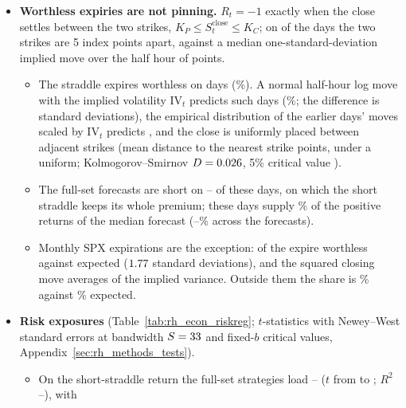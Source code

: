 \begin{itemize}
\item \textbf{Worthless expiries are not pinning.} $R_t = -1$ exactly when the close settles between the two strikes,
  $K_P \le S^{\mathrm{close}}_t \le K_C$; on \rhedGapFiveN{} of the \rheSzDays{} days the two strikes are 5 index
  points apart, against a median one-standard-deviation implied move over the half hour of \rhedMoveSdPts{} points.
  \begin{itemize}
  \item The straddle expires worthless on \rhedWorthN{} days (\rhedWorthPct\%). A normal half-hour log move with the
    implied volatility $\mathrm{IV}_t$ predicts \rhedWorthExpIV{} such days (\rhedWorthExpIVPct\%; the difference is
    \rhedWorthZ{} standard deviations), the empirical distribution of the earlier days' moves scaled by
    $\mathrm{IV}_t$ predicts \rhedWorthExpEmp, and the close is uniformly placed between adjacent strikes (mean
    distance to the nearest strike \rhedStrikeDist{} points, \rhedStrikeDistUnif{} under a uniform;
    Kolmogorov--Smirnov $D = 0.026$, 5\% critical value \rhedKsCV).
  \item The full-set forecasts are short on \rhedWorthShortMin--\rhedWorthShortMax{} of these days, on which the short
    straddle keeps its whole premium; these days supply \rhePoolWorthlessShareMed\% of the positive returns of the
    median forecast (\rhePoolWorthlessShareMin--\rhePoolWorthlessShareMax\% across the \rhrPoolN{}
    forecasts).
  \item Monthly SPX expirations are the exception: \rhedWorthOpexN{} of the \rhedOpexN{} expire worthless against
    \rhedWorthOpexExp{} expected ($1.77$ standard deviations), and the squared closing move averages
    \rhedOpexMoveSqIV{} of the implied variance. Outside them the share is \rhedWorthOtherPct\% against
    \rhedWorthOtherExpPct\% expected.
  \end{itemize}
\item \textbf{Risk exposures} (Table~\ref{tab:rh_econ_riskreg}; $t$-statistics with Newey--West standard errors at
  bandwidth $S = 33$ and fixed-$b$ critical values, Appendix~\ref{sec:rh_methods_tests}).
  \begin{itemize}
  \item On the short-straddle return the full-set strategies load \rhedRegBetaShortMin--\rhedRegBetaShortMax{}
    ($t$ from \rhedRegBetaShortTMin{} to \rhedRegBetaShortTMax; $R^2$ \rhedRegRsqAMin--\rhedRegRsqAMax), with

\end{itemize}
\end{itemize}
